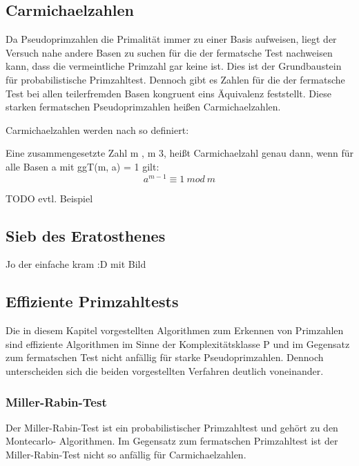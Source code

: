 	\subsection{Carmichaelzahlen}
	Da Pseudoprimzahlen die Primalität immer zu einer Basis aufweisen, liegt der Versuch nahe andere Basen zu suchen für die der fermatsche Test nachweisen kann, dass die vermeintliche Primzahl gar keine ist. Dies ist der Grundbaustein für probabilistische Primzahltest. Dennoch gibt es Zahlen für die der fermatsche Test bei allen teilerfremden Basen kongruent eins Äquivalenz feststellt. Diese starken fermatschen Pseudoprimzahlen heißen Carmichaelzahlen.
	
	Carmichaelzahlen werden nach \cite{Algebraische:und:zahlentheoretische:Grundlagen:fuer:die:Informatik} so definiert:
	
	Eine zusammengesetzte Zahl m \myin {}, m \myMathRM{\geq} 3, heißt Carmichaelzahl genau dann, wenn für alle Basen a mit ggT(m, a) = 1 gilt: 
	\begin{displaymath}
		a^{m-1} \equiv 1~mod~m
	\end{displaymath}
	
	
	TODO evtl. Beispiel
	
	\subsection{Sieb des Eratosthenes}
	
	Jo der einfache kram :D mit Bild
	
	
	\subsection{Effiziente Primzahltests}
		Die in diesem Kapitel vorgestellten Algorithmen zum Erkennen von Primzahlen sind effiziente Algorithmen im Sinne der Komplexitätsklasse P und im Gegensatz zum fermatschen Test nicht anfällig für starke Pseudoprimzahlen. Dennoch unterscheiden sich die beiden vorgestellten Verfahren deutlich voneinander. 
		
		\subsubsection{Miller-Rabin-Test}
		 Der Miller-Rabin-Test ist ein probabilistischer Primzahltest und gehört zu den Montecarlo- Algorithmen. Im Gegensatz zum fermatschen Primzahltest ist der Miller-Rabin-Test nicht so anfällig für Carmichaelzahlen.
		
